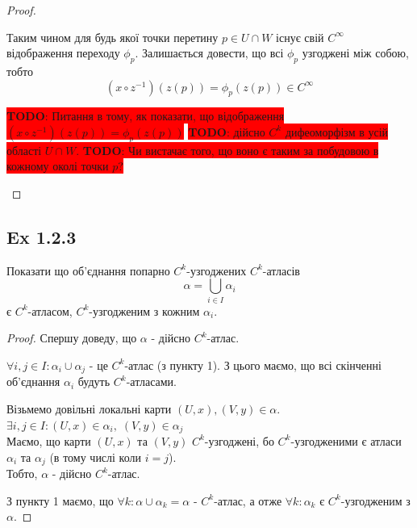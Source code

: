 \documentclass[10pt, a4paper]{article} %
\newcommand{\todo}[1]{\colorbox{red}{\textbf{TODO}: #1}}
\begin{document}
\begin{proof}
\begin{itemize}
        Таким чином для будь якої точки перетину $p\in U\cap W$ існує свій $C^\infty$ відображення переходу $\phi_p$.
        Залишається довести, що всі $\phi_p$ узгоджені між собою, тобто
        \[\left(x \circ z^{-1}\right)(z(p)) = \phi_p(z(p)) \in C^{\infty}\]


        \todo{Питання в тому, як показати, що відображення $\left(x \circ z^{-1}\right)(z(p)) = \phi_p(z(p))$} 
        \todo{дійсно $C^k$ дифеоморфізм в усій області $U\cap W$. }
        \todo{Чи вистачає того, що воно є таким за побудовою в кожному околі точки $p$?}

    \end{itemize}
\end{proof}

\subsection*{Ex 1.2.3}
\begin{mdframed}
    Показати що об'єднання попарно $C^k$-узгоджених $C^k$-атласів 
    \[\alpha = \bigcup_{i\in I} \alpha_i\] 
    є $C^k$-атласом, $C^k$-узгодженим з кожним $\alpha_i$.
\end{mdframed}

\begin{proof}
    
Спершу доведу, що $\alpha$ - дійсно $C^k$-атлас.

$\forall i,j\in I: \alpha_i \cup \alpha_j$ - це $C^k$-атлас (з пункту 1). З цього маємо, що всі скінченні об'єднання $\alpha_i$ будуть $C^k$-атласами.

Візьмемо довільні локальні карти $(U,x), (V,y) \in \alpha$.\\
$\exists i,j\in I: (U,x) \in \alpha_i, \; (V,y)\in\alpha_j$\\
Маємо, що карти $(U,x)$ та $(V,y)$ $C^k$-узгоджені, бо $C^k$-узгодженими є атласи $\alpha_i$ та $\alpha_j$ (в тому числі коли $i=j$).\\
Тобто, $\alpha$ - дійсно $C^k$-атлас.

З пункту 1 маємо, що $\forall k: \alpha \cup \alpha_k = \alpha$ - $C^k$-атлас, а отже $\forall k: \alpha_k$ є $C^k$-узгодженим з $\alpha$.

\end{proof}
\end{document}
